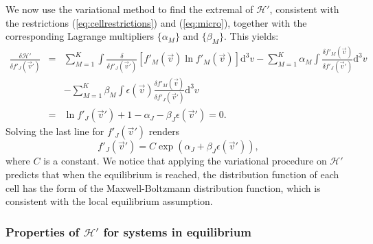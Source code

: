 We now use the variational method to find the extremal of $\mathcal{H}'$,
consistent with the restrictions
(\ref{eq:cellrestrictions}) and (\ref{eq:micro}), together with the corresponding Lagrange
multipliers $\{\alpha_M\}$ and $\{\beta_M\}$. This yields:
%
\begin{eqnarray}\label{eq:deltaHpdeltafpj}
    \frac{\delta \mathcal{H}'}{\delta f'_J(\vec{v}')} & = & \sum_{M=1}^{K}\int
      \frac{\delta}{\delta f'_J(\vec{v}')}\left[
        f'_M(\vec{v})\ln f'_M(\vec{v})
        \right]
       \mathrm{d}^3v -\sum_{M=1}^{K}\alpha_M\int
       	\frac{\delta f'_M(\vec{v})}{\delta f'_J(\vec{v}')}
      \mathrm{d}^3v\nonumber\\
    & & -\sum_{M=1}^{K}\beta_M\int\epsilon(\vec{v})
    	\frac{\delta f'_M(\vec{v})}{\delta f'_J(\vec{v}')}
      \mathrm{d}^3v \nonumber\\
    & = & \ln f'_J(\vec{v}')+1-\alpha_J-\beta_J \epsilon(\vec{v}')=0.
\end{eqnarray}
%
Solving the last line for $f'_J(\vec{v}')$ renders
%
\begin{equation}\label{eq:relacion1}
	f'_J(\vec{v}') = C\exp\left({\alpha_J+\beta_J \epsilon(\vec{v}') }\right),
\end{equation}
%
where $C$ is a constant. We notice that applying the variational procedure on
$\mathcal{H}'$ predicts that when the equilibrium is reached, the
distribution function of each cell has the form of the Maxwell-Boltzmann
distribution function, which is consistent with the local equilibrium assumption.

\subsubsection{Properties of $\mathcal{H}'$ for systems in equilibrium}

